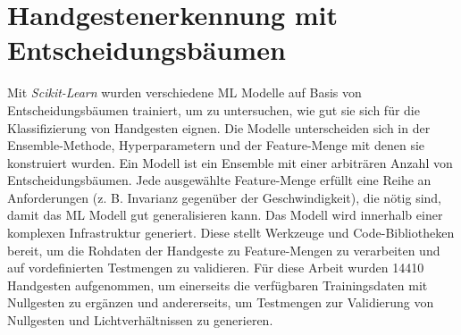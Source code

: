 \chapter{Handgestenerkennung mit Entscheidungsbäumen}
Mit \textit{Scikit-Learn} wurden verschiedene ML Modelle auf Basis von Entscheidungsbäumen trainiert, um zu untersuchen, wie gut sie sich für die Klassifizierung von Handgesten eignen.
Die Modelle unterscheiden sich in der Ensemble-Methode, Hyperparametern und der Feature-Menge mit denen sie konstruiert wurden. Ein Modell ist ein Ensemble mit einer arbiträren Anzahl von Entscheidungsbäumen.
Jede ausgewählte Feature-Menge erfüllt eine Reihe an Anforderungen (z. B. Invarianz gegenüber der Geschwindigkeit), die nötig sind, damit das ML Modell gut generalisieren kann.
\newline
\newline
Das Modell wird innerhalb einer komplexen Infrastruktur generiert. Diese stellt Werkzeuge und Code-Bibliotheken bereit, um die Rohdaten der Handgeste zu Feature-Mengen zu verarbeiten und auf vordefinierten
Testmengen zu validieren. Für diese Arbeit wurden 14410 Handgesten aufgenommen, um einerseits die verfügbaren Trainingsdaten mit Nullgesten zu ergänzen und andererseits, um Testmengen zur Validierung von Nullgesten
und Lichtverhältnissen zu generieren.




